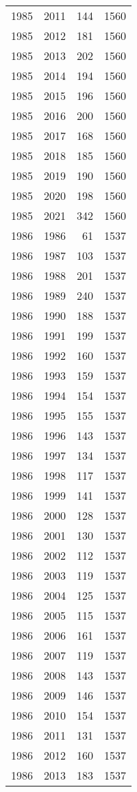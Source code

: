 \documentclass[
  10pt,
  letterpaper,
  DIV=11,
  numbers=noendperiod,
  twoside]{scrartcl}
\begin{document}
\begin{longtable}[]{@{}rrrr@{}}
1985 & 2011 & 144 & 1560 \\
1985 & 2012 & 181 & 1560 \\
1985 & 2013 & 202 & 1560 \\
1985 & 2014 & 194 & 1560 \\
1985 & 2015 & 196 & 1560 \\
1985 & 2016 & 200 & 1560 \\
1985 & 2017 & 168 & 1560 \\
1985 & 2018 & 185 & 1560 \\
1985 & 2019 & 190 & 1560 \\
1985 & 2020 & 198 & 1560 \\
1985 & 2021 & 342 & 1560 \\
1986 & 1986 & 61 & 1537 \\
1986 & 1987 & 103 & 1537 \\
1986 & 1988 & 201 & 1537 \\
1986 & 1989 & 240 & 1537 \\
1986 & 1990 & 188 & 1537 \\
1986 & 1991 & 199 & 1537 \\
1986 & 1992 & 160 & 1537 \\
1986 & 1993 & 159 & 1537 \\
1986 & 1994 & 154 & 1537 \\
1986 & 1995 & 155 & 1537 \\
1986 & 1996 & 143 & 1537 \\
1986 & 1997 & 134 & 1537 \\
1986 & 1998 & 117 & 1537 \\
1986 & 1999 & 141 & 1537 \\
1986 & 2000 & 128 & 1537 \\
1986 & 2001 & 130 & 1537 \\
1986 & 2002 & 112 & 1537 \\
1986 & 2003 & 119 & 1537 \\
1986 & 2004 & 125 & 1537 \\
1986 & 2005 & 115 & 1537 \\
1986 & 2006 & 161 & 1537 \\
1986 & 2007 & 119 & 1537 \\
1986 & 2008 & 143 & 1537 \\
1986 & 2009 & 146 & 1537 \\
1986 & 2010 & 154 & 1537 \\
1986 & 2011 & 131 & 1537 \\
1986 & 2012 & 160 & 1537 \\
1986 & 2013 & 183 & 1537 \\

\end{longtable}
\end{document}
